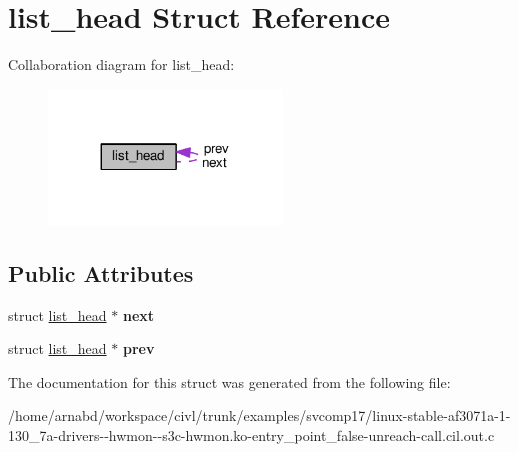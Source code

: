 \hypertarget{structlist__head}{}\section{list\+\_\+head Struct Reference}
\label{structlist__head}


Collaboration diagram for list\+\_\+head\+:
\nopagebreak
\begin{figure}[H]
\begin{center}
\leavevmode
\includegraphics[width=176pt]{structlist__head__coll__graph}
\end{center}
\end{figure}
\subsection*{Public Attributes}
\begin{DoxyCompactItemize}
\item 
\hypertarget{structlist__head_ac3b0ff0dfb978a0cfbdad6b9d19cdcfe}{}struct \hyperlink{structlist__head}{list\+\_\+head} $\ast$ {\bfseries next}\label{structlist__head_ac3b0ff0dfb978a0cfbdad6b9d19cdcfe}

\item 
\hypertarget{structlist__head_ae4298f7975979e5f6bb406c40c1fa443}{}struct \hyperlink{structlist__head}{list\+\_\+head} $\ast$ {\bfseries prev}\label{structlist__head_ae4298f7975979e5f6bb406c40c1fa443}

\end{DoxyCompactItemize}


The documentation for this struct was generated from the following file\+:\begin{DoxyCompactItemize}
\item 
/home/arnabd/workspace/civl/trunk/examples/svcomp17/linux-\/stable-\/af3071a-\/1-\/130\+\_\+7a-\/drivers-\/-\/hwmon-\/-\/s3c-\/hwmon.\+ko-\/entry\+\_\+point\+\_\+false-\/unreach-\/call.\+cil.\+out.\+c\end{DoxyCompactItemize}
